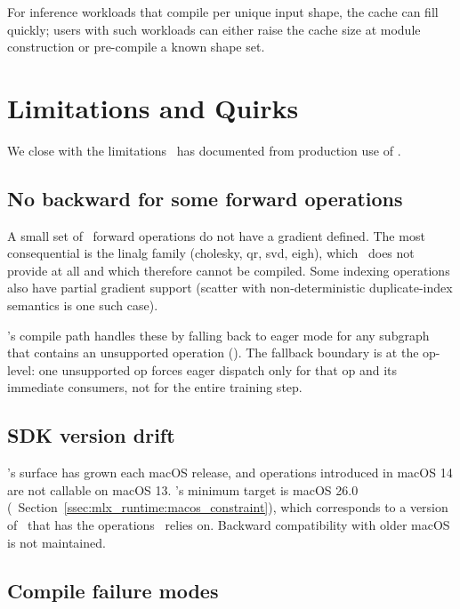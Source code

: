 For inference workloads that compile per unique input shape, the
cache can fill quickly; users with such workloads can either raise
the cache size at module construction or pre-compile a known shape
set.

\section{Limitations and Quirks}
\label{sec:metal_mpsgraph:limits}

We close with the limitations \Lucid\ has documented from production
use of \MPSGraph.

\subsection{No backward for some forward operations}
\label{ssec:metal_mpsgraph:no_backward}

A small set of \MPSGraph\ forward operations do not have a
gradient defined. The most consequential is the linalg family
(cholesky, qr, svd, eigh), which \MPSGraph\ does not provide at all
and which therefore cannot be compiled. Some indexing operations
also have partial gradient support (scatter with non-deterministic
duplicate-index semantics is one such case).

\Lucid's compile path handles these by falling back to eager mode
for any subgraph that contains an unsupported operation
(). The fallback boundary is at the
op-level: one unsupported op forces eager dispatch only for that
op and its immediate consumers, not for the entire training step.

\subsection{SDK version drift}
\label{ssec:metal_mpsgraph:sdk_drift}

\MPSGraph's surface has grown each macOS release, and operations
introduced in macOS 14 are not callable on macOS 13. \Lucid's
minimum target is macOS 26.0
(~Section~\ref{ssec:mlx_runtime:macos_constraint}),
which corresponds to a version of \MPSGraph\ that has the operations
\Lucid\ relies on. Backward compatibility with older macOS is not
maintained.

\subsection{Compile failure modes}
\label{ssec:metal_mpsgraph:compile_failure}

